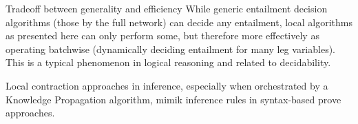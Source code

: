 
\begin{remark}{Tradeoff between generality and efficiency}
	While generic entailment decision algorithms (those by the full network) can decide any entailment, local algorithms as presented here can only perform some, but therefore more effectively as operating batchwise (dynamically deciding entailment for many leg variables).
	This is a typical phenomenon in logical reasoning and related to decidability.
\end{remark}

Local contraction approaches in inference, especially when orchestrated by a Knowledge Propagation algorithm, mimik inference rules in syntax-based prove approaches.
